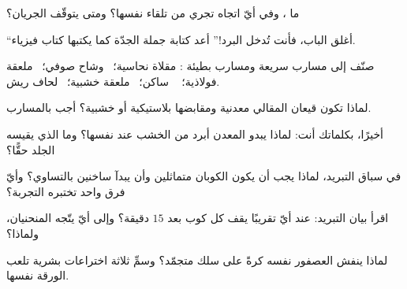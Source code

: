 \begin{exercise}[$\star$]\label{exo:g5:heat-and-insulation:1}
ما ، وفي أيّ اتجاه تجري من تلقاء نفسها؟ ومتى يتوقّف
الجريان؟
\end{exercise}

\begin{exercise}[$\star$]\label{exo:g5:heat-and-insulation:2}
``أغلق الباب، فأنت تُدخل البرد!'' أعد كتابة جملة الجدّة كما
يكتبها كتاب فيزياء.
\end{exercise}

\begin{exercise}[$\star$]\label{exo:g5:heat-and-insulation:3}
صنّف إلى مسارب سريعة ومسارب بطيئة : مقلاة نحاسية؛ \ وشاح
صوفي؛ \ ملعقة فولاذية؛ \  ساكن؛ \ ملعقة خشبية؛ \ لحاف
ريش.
\end{exercise}

\begin{exercise}[$\star$]\label{exo:g5:heat-and-insulation:4}
لماذا تكون قيعان المقالي معدنية ومقابضها بلاستيكية أو خشبية؟
أجب بالمسارب.
\end{exercise}

\begin{exercise}[$\star$]\label{exo:g5:heat-and-insulation:5}
أخيرًا، بكلماتك أنت: لماذا يبدو المعدن أبرد من الخشب عند  نفسها؟ وما الذي يقيسه الجلد حقًّا؟
\end{exercise}

\begin{exercise}[$\star$]\label{exo:g5:heat-and-insulation:6}
في سباق التبريد، لماذا يجب أن يكون الكوبان متماثلين وأن يبدآ
ساخنين بالتساوي؟ وأيّ فرق واحد تختبره التجربة؟
\end{exercise}

\begin{exercise}[$\star$]\label{exo:g5:heat-and-insulation:7}
اقرأ بيان التبريد: عند أيّ  تقريبًا يقف كل كوب بعد
$15$ دقيقة؟ وإلى أيّ  يتّجه المنحنيان، ولماذا؟
\end{exercise}

\begin{exercise}[$\star$]\label{exo:g5:heat-and-insulation:8}
لماذا ينفش العصفور نفسه كرةً على سلك متجمّد؟ وسمِّ ثلاثة
اختراعات بشرية تلعب الورقة نفسها.
\end{exercise}

